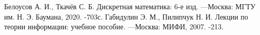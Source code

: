 \begin{thebibliography}{}
	 Белоусов А. И., Ткачёв С. Б. Дискретная математика: 6-е изд. ---Москва: МГТУ им. Н. Э. Баумана, 2020. -703с.
	 Габидулин Э. М., Пилипчук Н. И. Лекции по теории информации: учебное пособие. ---Москва: МИФИ, 2007. -213.
\end{thebibliography}
